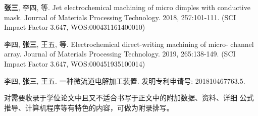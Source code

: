 \documentclass[
  type=master
]{gdutthesis}
\begin{document}
\nocite{*}%
\printbibliography



\begin{results}
  \item \textbf{张三}, 李四, 等. Jet electrochemical machining of micro dimples with conductive mask.
  Journal of Materials Processing Technology. 2018, 257:101-111. (SCI Impact Factor 3.647,
  WOS:000431161400010)
  \item 李四, \textbf{张三}, 王五, 等. Electrochemical direct-writing machining of micro- channel array.
  Journal of Materials Processing Technology. 2019, 265:138-149. (SCI Impact Factor 3.647,
  WOS:000451935100014)
\end{results}


\begin{results}
  \item 李四, \textbf{张三}, 王五. 一种微流道电解加工装置. 发明专利申请号: 201810467763.5.
\end{results}

\gdutstatement

\zhlipsum[1]

\gdutappendix

对需要收录于学位论文中且又不适合书写于正文中的附加数据、资料、详细
公式推导、计算机程序等有特色的内容，可做为附录排写。
\end{document}
